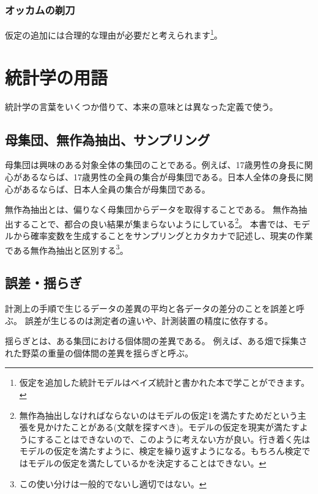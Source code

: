 \subsubsection{オッカムの剃刀}

仮定の追加には合理的な理由が必要だと考えられます\footnote{仮定を追加した統計モデルはベイズ統計と書かれた本で学ことができます。}。

\begin{figure}
    \begin{center}
%
\end{center}
\end{figure}
\fi

\section{統計学の用語}
統計学の言葉をいくつか借りて、本来の意味とは異なった定義で使う。


\subsection{母集団、無作為抽出、サンプリング}
母集団は興味のある対象全体の集団のことである。例えば、17歳男性の身長に関心があるならば、17歳男性の全員の集合が母集団である。日本人全体の身長に関心があるならば、日本人全員の集合が母集団である。

無作為抽出とは、偏りなく母集団からデータを取得することである。
無作為抽出することで、都合の良い結果が集まらないようにしている\footnote{無作為抽出しなければならないのはモデルの仮定1を満たすためだという主張を見かけたことがある(文献を探すべき)。モデルの仮定を現実が満たすようにすることはできないので、このように考えない方が良い。行き着く先はモデルの仮定を満たすように、検定を繰り返すようになる。もちろん検定ではモデルの仮定を満たしているかを決定することはできない。}。
本書では、モデルから確率変数を生成することをサンプリングとカタカナで記述し、現実の作業である無作為抽出と区別する\footnote{この使い分けは一般的でないし適切ではない。}。

\subsection{誤差・揺らぎ}
計測上の手順で生じるデータの差異の平均と各データの差分のことを誤差と呼ぶ。
誤差が生じるのは測定者の違いや、計測装置の精度に依存する。

揺らぎとは、ある集団における個体間の差異である。
例えば、ある畑で採集された野菜の重量の個体間の差異を揺らぎと呼ぶ。

